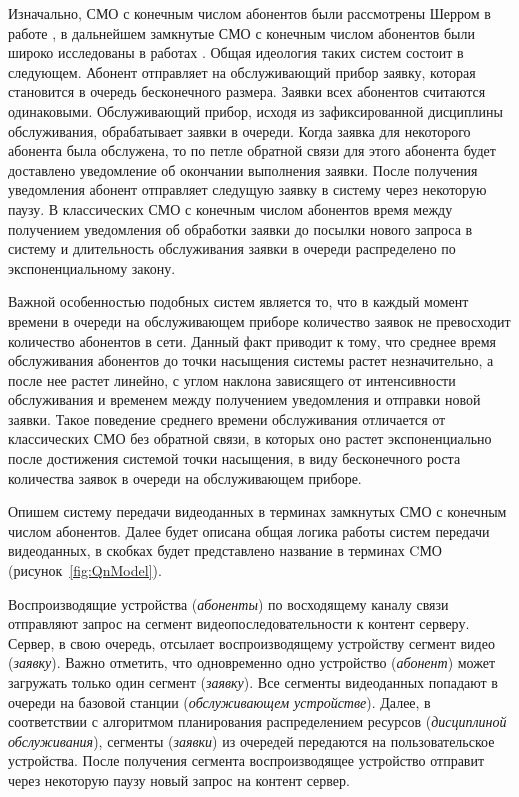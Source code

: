 Изначально, СМО с конечным числом абонентов были рассмотрены Шерром в работе \cite{scherr}, в дальнейшем замкнутые СМО с конечным числом абонентов были широко исследованы в работах \cite{adiri, simha, veran}. Общая идеология таких систем состоит в следующем. Абонент отправляет на обслуживающий прибор заявку, которая становится в очередь бесконечного размера. Заявки всех абонентов считаются одинаковыми. Обслуживающий прибор, исходя из зафиксированной дисциплины обслуживания, обрабатывает заявки в очереди. Когда заявка для некоторого абонента была обслужена, то по петле обратной связи для этого абонента будет доставлено уведомление об окончании выполнения заявки. После получения уведомления абонент отправляет следущую заявку в систему через некоторую паузу. В классических СМО с конечным числом абонентов время между получением уведомления об обработки заявки до посылки нового запроса в систему и длительность обслуживания заявки в очереди распределено по экспоненциальному закону.

Важной особенностью подобных систем является то, что в каждый момент времени в очереди на обслуживающем приборе количество заявок не превосходит количество абонентов в сети. Данный факт приводит к тому, что среднее время обслуживания абонентов до точки насыщения системы растет незначительно, а после нее растет линейно, с углом наклона зависящего от интенсивности обслуживания и временем между получением уведомления и отправки новой заявки. Такое поведение среднего времени обслуживания отличается от классических СМО без обратной связи, в которых оно растет экспоненциально после достижения системой точки насыщения, в виду бесконечного роста количества заявок в очереди на обслуживающем приборе.

Опишем систему передачи видеоданных в терминах замкнутых СМО с конечным числом абонентов. Далее будет описана общая логика работы систем передачи видеоданных, в скобках будет представлено название в терминах CМО (рисунок~\ref{fig:QnModel}).

Воспроизводящие устройства (\textit{абоненты}) по восходящему каналу связи отправляют запрос на сегмент видеопоследовательности к контент серверу. Сервер, в свою очередь, отсылает воспроизводящему устройству сегмент видео (\textit{заявку}). Важно отметить, что одновременно одно устройство (\textit{абонент}) может загружать только один сегмент (\textit{заявку}). Все сегменты видеоданных попадают в очереди на базовой станции (\textit{обслуживающем устройстве}). Далее, в соответствии с алгоритмом планирования распределением ресурсов (\textit{дисциплиной обслуживания}), сегменты (\textit{заявки}) из очередей передаются на пользовательское устройства. После получения сегмента воспроизводящее устройство отправит через некоторую паузу новый запрос на контент сервер.

